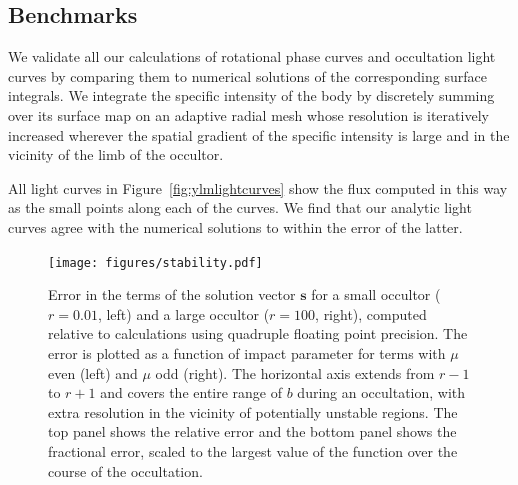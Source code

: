 \documentclass[modern]{aastex61}
\begin{document}
\subsection{Benchmarks}
\label{sec:starrybenchmarks}

We validate all our calculations of rotational phase curves and occultation
light curves by comparing them to numerical solutions of the corresponding
surface integrals. We integrate the specific intensity of the body by
discretely summing over its surface map on an adaptive radial mesh whose
resolution is iteratively increased wherever the spatial gradient of the
%
%
specific intensity is large and in the vicinity of the limb of the occultor.

%
%

All light curves in Figure~\ref{fig:ylmlightcurves} show the flux computed
in this way as the small points along each of the curves. We find that our
analytic light curves agree with the numerical solutions to within the error
of the latter.

\begin{figure}[p!]
    \begin{centering}
    \texttt{[image: figures/stability.pdf]}
    \caption{\label{fig:stability}
             Error in the terms of the solution vector $\mathbf{s}$ for a small
             occultor ($r = 0.01$, left) and a large occultor ($r = 100$, right),
             computed relative to calculations using quadruple
             floating point precision. The error is plotted as a function of impact parameter
             for terms with $\mu$ even (left)
             and $\mu$ odd (right). The horizontal axis extends from $r - 1$ to $r + 1$ and covers
             the entire range of $b$ during an occultation, with extra resolution in the
             vicinity of potentially unstable regions. The top panel shows the relative error
             and the bottom panel shows the fractional error, scaled to the largest value of
             the function over the course of the occultation.
             }
    \end{centering}
\end{figure}
\end{document}
